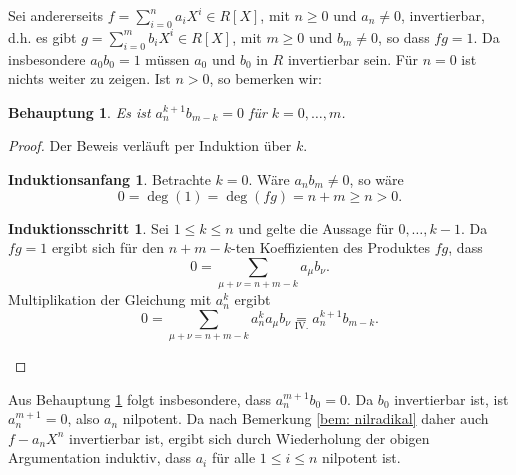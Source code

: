 \documentclass[a4paper,10pt]{article}
\newcounter{satze}
\newtheorem{beh}[satze]{Behauptung}
\theoremstyle{definition}
\newtheorem*{ia}{Induktionsanfang}
\newtheorem*{is}{Induktionsschritt}
\begin{document}
Sei andererseits $f = \sum_{i=0}^n a_i X^i \in R[X]$, mit $n \geq 0$ und $a_n \neq 0$, invertierbar, d.h. es gibt $g = \sum_{i=0}^m b_i X^i \in R[X]$, mit $m \geq 0$ und $b_m \neq 0$, so dass $fg = 1$. Da insbesondere $a_0 b_0 = 1$ müssen $a_0$ und $b_0$ in $R$ invertierbar sein. Für $n=0$ ist nichts weiter zu zeigen. Ist $n > 0$, so bemerken wir:

\begin{beh}\label{beh: a_n nilpotent}
 Es ist $a_n^{k+1} b_{m-k} = 0$ für $k=0,\ldots,m$.
\end{beh}
\begin{proof}
 Der Beweis verläuft per Induktion über $k$.
 \begin{ia}Betrachte $k=0$. Wäre $a_n b_m \neq 0$, so wäre
  \[
   0 = \deg(1) = \deg(fg) = n+m \geq n > 0.
  \]
 \end{ia}
 \begin{is}
 Sei $1 \leq k \leq n$ und gelte die Aussage für $0,\ldots,k-1$. Da $fg = 1$ ergibt sich für den $n+m-k$-ten Koeffizienten des Produktes $fg$, dass
 \[
  0 = \sum_{\mu+\nu = n+m-k} a_\mu b_\nu.
 \]
 Multiplikation der Gleichung mit $a_n^k$ ergibt
 \[
  0 = \sum_{\mu+\nu = n+m-k} a_n^k a_\mu b_\nu \underset{\text{IV.}}= a_n^{k+1} b_{m-k}.
 \]
 \end{is}
\end{proof}
Aus Behauptung \ref{beh: a_n nilpotent} folgt insbesondere, dass $a_n^{m+1} b_0 = 0$. Da $b_0$ invertierbar ist, ist $a_n^{m+1} = 0$, also $a_n$ nilpotent. Da nach Bemerkung \ref{bem: nilradikal} daher auch $f- a_n X^n$ invertierbar ist, ergibt sich durch Wiederholung der obigen Argumentation induktiv, dass $a_i$ für alle $1 \leq i \leq n$ nilpotent ist.





\section{}
\end{document}
